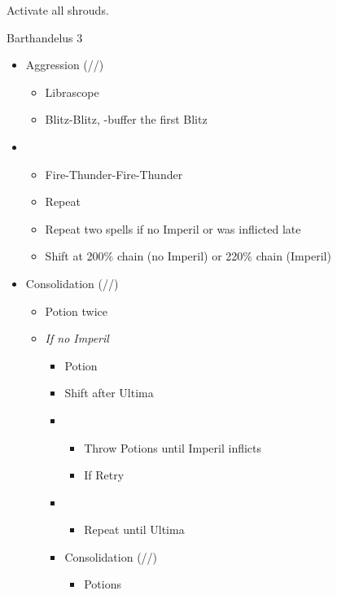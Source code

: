 \renewcommand{\second}{[2] Aggression (\com/\com/\rav)}
\renewcommand{\third}{[3] Consolidation (\sen/\sen/\med)}
\renewcommand{\fourth}{[4] Malevolence (\syn/\rav/\rav)}

Activate all shrouds.

\begin{battle}{Barthandelus 3}
\begin{multicols}{2}
\begin{itemize}
    \item \second
    \begin{itemize}
        \item Librascope
        \item Blitz-Blitz, \rav-buffer the first Blitz
    \end{itemize}
    \item \fifth
    \begin{itemize}
        \item Fire-Thunder-Fire-Thunder
        \item Repeat
        \item Repeat two spells if no Imperil or was inflicted late
        \item Shift at 200\% chain (no Imperil) or 220\% chain (Imperil)
    \end{itemize}
    \item \third
    \begin{itemize}
        \item Potion twice
        \item \textit{If no Imperil}
        \begin{itemize}
            \item Potion
            \item Shift after Ultima
            \item \fifth
            \begin{itemize}
                \item Throw Potions until Imperil inflicts
                \item If \stagger Retry
            \end{itemize}
            \item \first
            \begin{itemize}
                \item Repeat until Ultima
            \end{itemize}
            \item \third
            \begin{itemize}
                \item Potions

\end{itemize}
\end{itemize}
\end{itemize}
\end{itemize}
\end{multicols}
\end{battle}
